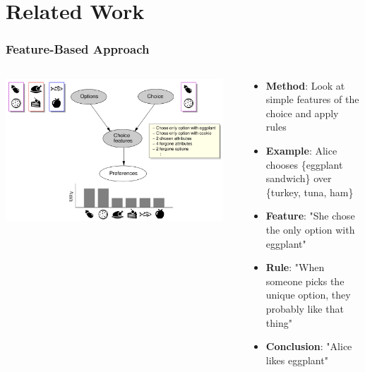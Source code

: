 \documentclass{beamer}
\begin{document}
\section{Related Work}
\begin{frame}
\frametitle{Feature-Based Approach}
\begin{columns}
\begin{column}{0.5\textwidth}
\begin{center}
\includegraphics[width=0.95\textwidth]{feature_based.png}
\end{center}
\end{column}
\begin{column}{0.5\textwidth}
\begin{itemize}
    \item \textbf{Method}: Look at simple features of the choice and apply rules
    \item \textbf{Example}: Alice chooses \{eggplant sandwich\} over \{turkey, tuna, ham\}
    \item \textbf{Feature}: "She chose the only option with eggplant"
    \item \textbf{Rule}: "When someone picks the unique option, they probably like that thing"
    \item \textbf{Conclusion}: "Alice likes eggplant"
\end{itemize}
\end{column}
\end{columns}
\end{frame}
\end{document}
